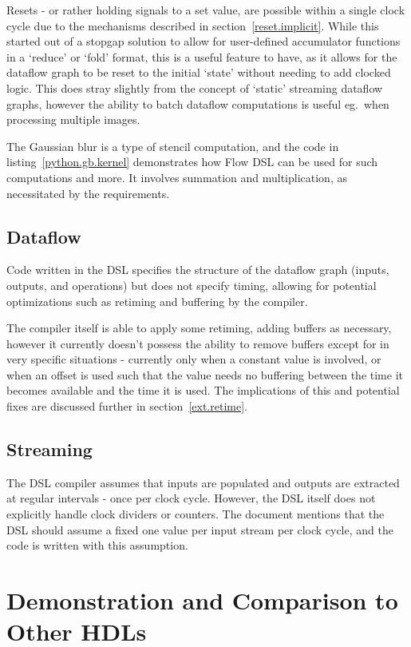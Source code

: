 Resets \hyphen{} or rather holding signals to a set value, are possible within a single clock cycle due to the mechanisms described in section \ref{reset.implicit}. While this started out of a stopgap solution to allow for user-defined accumulator functions in a `reduce' or `fold' format, this is a useful feature to have, as it allows for the dataflow graph to be reset to the initial `state' without needing to add clocked logic. This does stray slightly from the concept of `static' streaming dataflow graphs, however the ability to batch dataflow computations is useful eg. when processing multiple images.

The Gaussian blur is a type of stencil computation, and the code in listing \ref{python.gb.kernel} demonstrates how Flow DSL can be used for such computations and more. It involves summation and multiplication, as necessitated by the requirements.

\subsection{Dataflow}
Code written in the DSL specifies the structure of the dataflow graph (inputs, outputs, and operations) but does not specify timing, allowing for potential optimizations such as retiming and buffering by the compiler.

The compiler itself is able to apply some retiming, adding buffers as necessary, however it currently doesn't possess the ability to remove buffers except for in very specific situations \hyphen{} currently only when a constant value is involved, or when an offset is used such that the value needs no buffering between the time it becomes available and the time it is used. The implications of this and potential fixes are discussed further in section \ref{ext.retime}.

\subsection{Streaming}
The DSL compiler assumes that inputs are populated and outputs are extracted at regular intervals \hyphen{} once per clock cycle. However, the DSL itself does not explicitly handle clock dividers or counters. The document mentions that the DSL should assume a fixed one value per input stream per clock cycle, and the code is written with this assumption.

\section{Demonstration and Comparison to Other HDLs}
